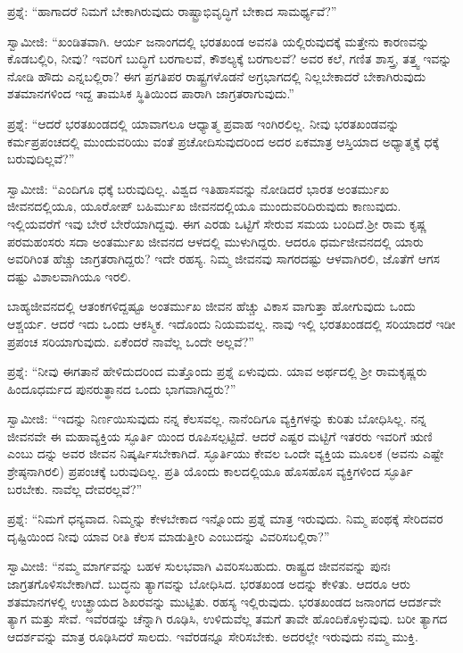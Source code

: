 ಪ್ರಶ್ನೆ: “ಹಾಗಾದರೆ ನಿಮಗೆ ಬೇಕಾಗಿರುವುದು ರಾಷ್ಟ್ರಾಭಿವೃದ್ಧಿಗೆ ಬೇಕಾದ ಸಾಮರ್ಥ್ಯವೆ?”

ಸ್ವಾಮೀಜಿ: “ಖಂಡಿತವಾಗಿ. ಆರ್ಯ ಜನಾಂಗದಲ್ಲಿ ಭರತಖಂಡ ಅವನತಿ ಯಲ್ಲಿರುವುದಕ್ಕೆ ಮತ್ತೇನು ಕಾರಣವನ್ನು ಕೊಡಬಲ್ಲಿರಿ, ನೀವು? ಇವರಿಗೆ ಬುದ್ಧಿಗೆ ಬರಗಾಲವೆ, ಕೌಶಲ್ಯಕ್ಕೆ ಬರಗಾಲವೆ? ಅವರ ಕಲೆ, ಗಣಿತ ಶಾಸ್ತ್ರ, ತತ್ತ್ವ ಇವನ್ನು ನೋಡಿ ಹೌದು ಎನ್ನಬಲ್ಲಿರಾ? ಈಗ ಪ್ರಗತಿಪರ ರಾಷ್ಟ್ರಗಳೊಡನೆ ಅಗ್ರಭಾಗದಲ್ಲಿ ನಿಲ್ಲಬೇಕಾದರೆ ಬೇಕಾಗಿರುವುದು ಶತಮಾನಗಳಿಂದ ಇದ್ದ ತಾಮಸಿಕ ಸ್ಥಿತಿಯಿಂದ ಪಾರಾಗಿ ಜಾಗ್ರತರಾಗುವುದು.”

ಪ್ರಶ್ನೆ: “ಆದರೆ ಭರತಖಂಡದಲ್ಲಿ ಯಾವಾಗಲೂ ಆಧ್ಯಾತ್ಮ ಪ್ರವಾಹ ಇಂಗಿರಲಿಲ್ಲ. ನೀವು ಭರತಖಂಡವನ್ನು ಕರ್ಮಪ್ರಪಂಚದಲ್ಲಿ ಮುಂದುವರಿಯು ವಂತೆ ಪ್ರಚೋದಿಸುವುದರಿಂದ ಅದರ ಏಕಮಾತ್ರ ಆಸ್ತಿಯಾದ ಅಧ್ಯಾತ್ಮಕ್ಕೆ ಧಕ್ಕೆ ಬರುವುದಿಲ್ಲವೆ?”

ಸ್ವಾಮೀಜಿ: “ಎಂದಿಗೂ ಧಕ್ಕೆ ಬರುವುದಿಲ್ಲ. ವಿಶ್ವದ ಇತಿಹಾಸವನ್ನು ನೋಡಿದರೆ ಭಾರತ ಅಂತರ್ಮುಖ ಜೀವನದಲ್ಲಿಯೂ, ಯೂರೋಪ್​ ಬಹಿರ್ಮುಖ ಜೀವನದಲ್ಲಿಯೂ ಮುಂದುವರಿದಿರುವುದು ಕಾಣುವುದು. ಇಲ್ಲಿಯವರೆಗೆ ಇವು ಬೇರೆ ಬೇರೆಯಾಗಿದ್ದವು. ಈಗ ಎರಡು ಒಟ್ಟಿಗೆ ಸೇರುವ ಸಮಯ ಬಂದಿದೆ.ಶ‍್ರೀ ರಾಮ ಕೃಷ್ಣ ಪರಮಹಂಸರು ಸದಾ ಅಂತರ್ಮುಖ ಜೀವನದ ಆಳದಲ್ಲಿ ಮುಳುಗಿದ್ದರು. ಆದರೂ ಧರ್ಮಜೀವನದಲ್ಲಿ ಯಾರು ಅವರಿಗಿಂತ ಹೆಚ್ಚು ಜಾಗ್ರತರಾಗಿದ್ದರು? ಇದೇ ರಹಸ್ಯ. ನಿಮ್ಮ ಜೀವನವು ಸಾಗರದಷ್ಟು ಆಳವಾಗಿರಲಿ, ಜೊತೆಗೆ ಆಗಸ ದಷ್ಟು ವಿಶಾಲವಾಗಿಯೂ ಇರಲಿ.

ಬಾಹ್ಯಜೀವನದಲ್ಲಿ ಆತಂಕಗಳಿದ್ದಷ್ಟೂ ಅಂತರ್ಮುಖ ಜೀವನ ಹೆಚ್ಚು ವಿಕಾಸ ವಾಗುತ್ತಾ ಹೋಗುವುದು ಒಂದು ಆಶ್ಚರ್ಯ. ಆದರೆ ಇದು ಒಂದು ಆಕಸ್ಮಿಕ. ಇದೊಂದು ನಿಯಮವಲ್ಲ. ನಾವು ಇಲ್ಲಿ ಭರತಖಂಡದಲ್ಲಿ ಸರಿಯಾದರೆ ಇಡೀ ಪ್ರಪಂಚ ಸರಿಯಾಗುವುದು. ಏಕೆಂದರೆ ನಾವೆಲ್ಲ ಒಂದೇ ಅಲ್ಲವೆ?”

ಪ್ರಶ್ನೆ: “ನೀವು ಈಗತಾನೆ ಹೇಳಿದುದರಿಂದ ಮತ್ತೊಂದು ಪ್ರಶ್ನೆ ಏಳುವುದು. ಯಾವ ಅರ್ಥದಲ್ಲಿ ಶ‍್ರೀ ರಾಮಕೃಷ್ಣರು ಹಿಂದೂಧರ್ಮದ ಪುನರುತ್ಥಾನದ ಒಂದು ಭಾಗವಾಗಿದ್ದರು?”

ಸ್ವಾಮೀಜಿ: “ಇದನ್ನು ನಿರ್ಣಯಿಸುವುದು ನನ್ನ ಕೆಲಸವಲ್ಲ. ನಾನೆಂದಿಗೂ ವ್ಯಕ್ತಿಗಳನ್ನು ಕುರಿತು ಬೋಧಿಸಿಲ್ಲ. ನನ್ನ ಜೀವನವೇ ಈ ಮಹಾವ್ಯಕ್ತಿಯ ಸ್ಫೂರ್ತಿ ಯಿಂದ ರೂಪಿಸಲ್ಪಟ್ಟಿದೆ. ಆದರೆ ಎಷ್ಟರ ಮಟ್ಟಿಗೆ ಇತರರು ಇವರಿಗೆ ಋಣಿ ಎಂಬು ದನ್ನು ಅವರ ಜೀವನ ನಿಷ್ಕರ್ಷಿಸಬೇಕಾಗಿದೆ. ಸ್ಫೂರ್ತಿಯು ಕೇವಲ ಒಂದೇ ವ್ಯಕ್ತಿಯ ಮೂಲಕ (ಅವನು ಎಷ್ಟೇ ಶ್ರೇಷ್ಠನಾಗಿರಲಿ) ಪ್ರಪಂಚಕ್ಕೆ ಬರುವುದಿಲ್ಲ. ಪ್ರತಿ ಯೊಂದು ಕಾಲದಲ್ಲಿಯೂ ಹೊಸಹೊಸ ವ್ಯಕ್ತಿಗಳಿಂದ ಸ್ಫೂರ್ತಿ ಬರಬೇಕು. ನಾವೆಲ್ಲ ದೇವರಲ್ಲವೆ?”

ಪ್ರಶ್ನೆ: “ನಿಮಗೆ ಧನ್ಯವಾದ. ನಿಮ್ಮನ್ನು ಕೇಳಬೇಕಾದ ಇನ್ನೊಂದು ಪ್ರಶ್ನೆ ಮಾತ್ರ ಇರುವುದು. ನಿಮ್ಮ ಪಂಥಕ್ಕೆ ಸೇರಿದವರ ದೃಷ್ಟಿಯಿಂದ ನೀವು ಯಾವ ರೀತಿ ಕೆಲಸ ಮಾಡುತ್ತೀರಿ ಎಂಬುದನ್ನು ವಿವರಿಸಬಲ್ಲಿರಾ?”

ಸ್ವಾಮೀಜಿ: “ನಮ್ಮ ಮಾರ್ಗವನ್ನು ಬಹಳ ಸುಲಭವಾಗಿ ವಿವರಿಸಬಹುದು. ರಾಷ್ಟ್ರದ ಜೀವನವನ್ನು ಪುನಃ ಜಾಗ್ರತಗೊಳಿಸಬೇಕಾಗಿದೆ. ಬುದ್ಧನು ತ್ಯಾಗವನ್ನು ಬೋಧಿಸಿದ. ಭರತಖಂಡ ಅದನ್ನು ಕೇಳಿತು. ಆದರೂ ಆರು ಶತಮಾನಗಳಲ್ಲಿ ಉಚ್ಛ್ರಾಯದ ಶಿಖರವನ್ನು ಮುಟ್ಟಿತು. ರಹಸ್ಯ ಇಲ್ಲಿರುವುದು. ಭರತಖಂಡದ ಜನಾಂಗದ ಆದರ್ಶವೇ ತ್ಯಾಗ ಮತ್ತು ಸೇವೆ. ಇವೆರಡನ್ನು ಚೆನ್ನಾಗಿ ರೂಢಿಸಿ, ಉಳಿದುವೆಲ್ಲ ತಮಗೆ ತಾವೇ ಹೊಂದಿಕೊಳ್ಳುವುವು. ಬರೀ ತ್ಯಾಗದ ಆದರ್ಶವನ್ನು ಮಾತ್ರ ರೂಢಿಸಿದರೆ ಸಾಲದು. ಇವೆರಡನ್ನೂ ಸೇರಿಸಬೇಕು. ಅದರಲ್ಲೇ ಇರುವುದು ನಮ್ಮ ಮುಕ್ತಿ.


